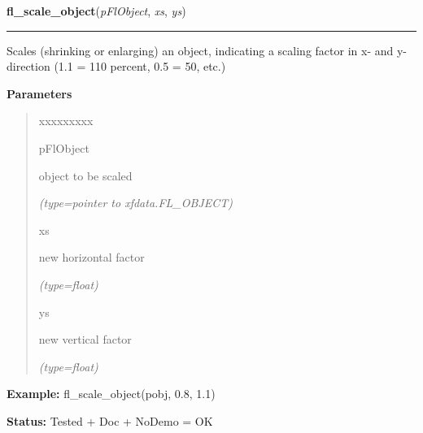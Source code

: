     \label{xformslib:flbasic:fl_scale_object}

    \vspace{0.5ex}

\hspace{.8\funcindent}\begin{boxedminipage}{\funcwidth}

    \raggedright \textbf{fl\_scale\_object}(\textit{pFlObject}, \textit{xs}, \textit{ys})

    \vspace{-1.5ex}

    \rule{\textwidth}{0.5\fboxrule}
\setlength{\parskip}{2ex}
    Scales (shrinking or enlarging) an object, indicating a scaling factor 
    in x- and y-direction (1.1 = 110 percent, 0.5 = 50, etc.)

\setlength{\parskip}{1ex}
      \textbf{Parameters}
      \vspace{-1ex}

      \begin{quote}
        \begin{Ventry}{xxxxxxxxx}

          \item[pFlObject]

          object to be scaled

            {\it (type=pointer to xfdata.FL\_OBJECT)}

          \item[xs]

          new horizontal factor

            {\it (type=float)}

          \item[ys]

          new vertical factor

            {\it (type=float)}

        \end{Ventry}

      \end{quote}

\textbf{Example:} fl\_scale\_object(pobj, 0.8, 1.1)



\textbf{Status:} Tested + Doc + NoDemo = OK



    \end{boxedminipage}

